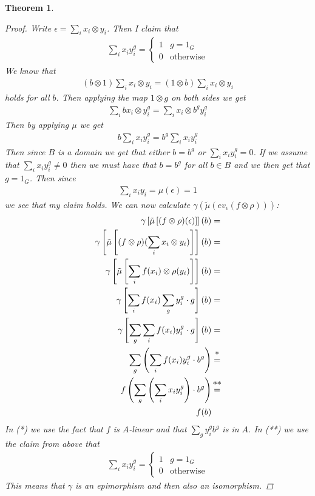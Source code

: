 \documentclass[11pt, a4paper, english]{article}
\numberwithin{prop}{section}
\numberwithin{lemma}{section}
\newtheorem{theorem}{Theorem}
\numberwithin{theorem}{section}
\numberwithin{defin}{section}
\numberwithin{example}{section}
\begin{document}
\begin{theorem}
\begin{proof}
Write $\epsilon = \sum\limits_i x_i \otimes y_i$. Then I claim that 
\begin{align*}
\sum_i x_i y_i^g = \begin{cases}
1 & g = 1_G\\
0 & \text{otherwise}
\end{cases}
\end{align*}
We know that 
\begin{align*}
(b \otimes 1)\sum_i x_i \otimes y_i = (1 \otimes b)\sum_i x_i \otimes y_i
\end{align*}
holds for all $b$. Then applying the map $1 \otimes g$ on both sides we get
\begin{align*}
\sum_i bx_i \otimes y_i^g = \sum_i x_i \otimes b^gy_i^g
\end{align*}
Then by applying $\mu$ we get 
\begin{align*}
b\sum_i x_i y_i^g = b^g\sum_i x_i  y_i^g
\end{align*}
Then since $B$ is a domain we get that either $b = b^g$ or $\sum_i x_i  y_i^g = 0$. If we assume that $\sum_i x_i  y_i^g \neq 0$ then we must have that $b = b^g$ for all $b \in B$ and we then get that $g = 1_G$. Then since
\begin{align*}
\sum_i x_i  y_i = \mu(\epsilon) = 1
\end{align*}
we see that my claim holds. We can now calculate $\gamma(\tilde{\mu}(ev_\epsilon(f \otimes \rho)))$:
\begin{align*}
\gamma \left[ \tilde{\mu} \left[ (f \otimes \rho)(\epsilon) \right] \right] (b) &=\\ 
\gamma \left[ \tilde{\mu} \left[ (f \otimes \rho)(\sum_i x_i \otimes y_i) \right] \right] (b) &=\\
\gamma \left[ \tilde{\mu} \left[ \sum_i f(x_i) \otimes \rho(y_i) \right] \right] (b) &=\\
\gamma \left[ \sum_i f(x_i) \sum_g y_i^g \cdot g \right] (b) &=\\
\gamma \left[ \sum_g \sum_i f(x_i) y_i^g \cdot g \right] (b) &=\\
\sum_g \left(\sum_i f(x_i) y_i^g \cdot b^g \right) &\stackrel{\mathclap{\normalfont\mbox{*}}}{=}\\
f \left( \sum_g \left(\sum_i x_i y_i^g \right) \cdot b^g \right) &\stackrel{\mathclap{\normalfont\mbox{**}}}{=}\\
f(b) &
\end{align*}
In (*) we use the fact that $f$ is $A$-linear and that $\sum_g y_i^g b^g$ is in $A$. In (**) we use the claim from above that 
\begin{align*}
\sum_i x_i y_i^g = \begin{cases}
1 & g = 1_G\\
0 & \text{otherwise}
\end{cases}
\end{align*}
This means that $\gamma$ is an epimorphism and then also an isomorphism.
\end{proof}
\end{theorem}
\end{document}
